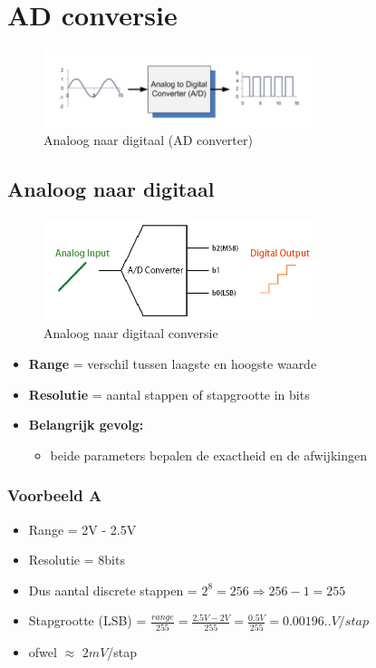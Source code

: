 \documentclass{article}
\newcommand{\bold}[1]{\textbf{#1}}
\begin{document}
\section{AD conversie}

\begin{figure}[H]
    \centering
    \includegraphics[width=0.7\textwidth]{Screenshot_20200224_115204.png}
    \caption{Analoog naar digitaal (AD converter)}
\end{figure}

\subsection{Analoog naar digitaal}

\begin{figure}[H]
    \centering
    \includegraphics[width=0.7\textwidth]{Screenshot_20200224_115430.jpg}
    \caption{Analoog naar digitaal conversie}
\end{figure}

\begin{itemize}
    \item \bold{Range} = verschil tussen laagste en hoogste waarde
    \item \bold{Resolutie} = aantal stappen of stapgrootte in bits
    \item \bold{Belangrijk gevolg:}
    \begin{itemize}
        \item beide parameters bepalen de exactheid en de afwijkingen
    \end{itemize}
\end{itemize}

\subsubsection{Voorbeeld A}
\begin{itemize}
    \item Range = 2V - 2.5V
    \item Resolutie = 8bits
    \item Dus aantal discrete stappen = $2^8 = 256 \Rightarrow 256 - 1 = 255$
    \item Stapgrootte (LSB) = $\frac{range}{255} = \frac{2.5V - 2V}{255} = \frac{0.5V}{255} = 0.00196..V / stap$
    \item ofwel $\approx$ $2mV$/stap
\end{itemize}
\end{document}
